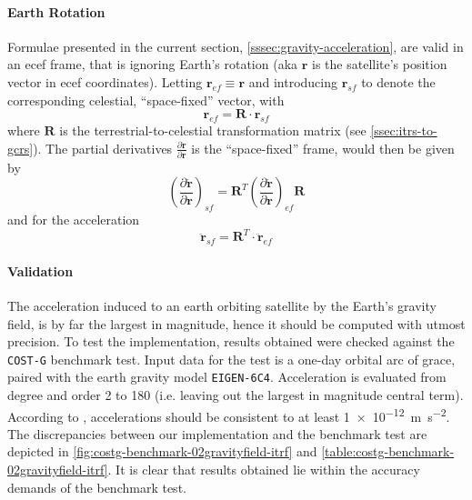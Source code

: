 \paragraph{Earth Rotation}\label{sssec:gravity-acceleration-earth-rotation}

Formulae presented in the current section, \autoref{sssec:gravity-acceleration}, 
are valid in an \gls{ecef} frame, that is ignoring Earth's rotation (aka $\bm{r}$ is 
the satellite's position vector in \gls{ecef} coordinates). Letting 
$\bm{r}_{ef} \equiv \bm{r}$ and introducing $\bm{r}_{sf}$ to denote the corresponding 
celestial, ``space-fixed'' vector, with
\begin{equation}
  \bm{r}_{ef} = \bm{R} \cdot \bm{r}_{sf}
\end{equation}
where $\bm{R}$ is the terrestrial-to-celestial transformation matrix (see 
\autoref{ssec:itrs-to-gcrs}). The partial derivatives 
$\frac{\partial \bm{\ddot{r}}}{\partial \bm{r}}$ is the ``space-fixed'' 
frame, would then be given by
\begin{equation}
  \left( \frac{\partial \bm{\ddot{r}}}{\partial \bm{r}} \right) _{sf} = 
  \bm{R}^T 
  \left( \frac{\partial \bm{\ddot{r}}}{\partial \bm{r}} \right) _{ef}
  \bm{R}
\end{equation}
and for the acceleration
\begin{equation}
  \bm{\ddot{r}}_{sf} = \bm{R}^T \cdot \bm{\ddot{r}}_{ef}
\end{equation}

\paragraph{Validation}\label{sssec:gravity-acceleration-acceleration}

The acceleration induced to an earth orbiting satellite by the Earth's gravity 
field, is by far the largest in magnitude, hence it should be computed with utmost 
precision. To test the implementation, results obtained were checked against the 
\texttt{COST-G} benchmark test. Input data for the test is a one-day orbital arc 
of \gls{grace}, paired with the earth gravity model \texttt{EIGEN-6C4}. Acceleration 
is evaluated from degree and order 2 to 180 (i.e. leaving out the largest in 
magnitude central term). According to \cite{Lasser23}, accelerations should be 
consistent to at least \SI{1e-12}{\metre\per\square\second}. The discrepancies 
between our implementation and the benchmark test are depicted in 
\autoref{fig:costg-benchmark-02gravityfield-itrf} and 
\autoref{table:costg-benchmark-02gravityfield-itrf}. It is clear that results 
obtained lie within the accuracy demands of the benchmark test.

